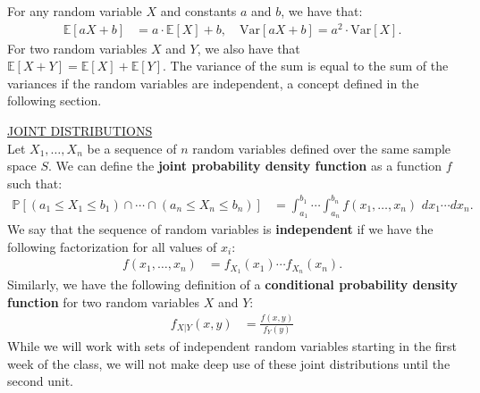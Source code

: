 \documentclass{tufte-handout}
\newcommand{\E}{\mathbb{E}}
\newcommand{\Prob}{\mathbb{P}}
\newcommand{\V}{\text{Var}}
\begin{document}
For any random variable $X$ and constants $a$ and $b$, we have that:
\begin{align*}
\E[a X + b] &= a \cdot \E [X] + b, \quad \V[a X + b] = a^2 \cdot \V[X].
\end{align*}
For two random variables $X$ and $Y$, we also have that
$\E[X + Y] = \E[X] + \E[Y]$. The variance of the sum is equal to the sum
of the variances if the random variables are independent, a concept defined
in the following section.

\vspace*{18pt}

\noindent
\underline{JOINT DISTRIBUTIONS} \\
Let $X_1, \ldots, X_n$ be a sequence of $n$ random variables defined
over the same sample space $S$. We can define the \textbf{joint probability
density function} as a function $f$ such that:
\begin{align*}
\Prob [(a_1 \leq X_1 \leq b_1) \cap \cdots \cap (a_n \leq X_n \leq b_n)]
&= \int_{a_1}^{b_1} \cdots \int_{a_n}^{b_n} f(x_1, \ldots, x_n) \, \, dx_1 \cdots dx_n.
\end{align*}
We say that the sequence of random variables is \textbf{independent}
if we have the following factorization for all values of $x_i$:
\begin{align*}
f(x_1, \ldots, x_n) &= f_{X_1}(x_1) \cdots f_{X_n}(x_n).
\end{align*}
Similarly, we have the following definition of a \textbf{conditional probability
density function} for two random variables $X$ and $Y$:
\begin{align*}
f_{X|Y} (x, y) &= \frac{f(x, y)}{f_Y(y)}
\end{align*}
While we will work with sets of independent random variables starting
in the first week of the class, we will not make deep use of these
joint distributions until the second unit.
\end{document}
